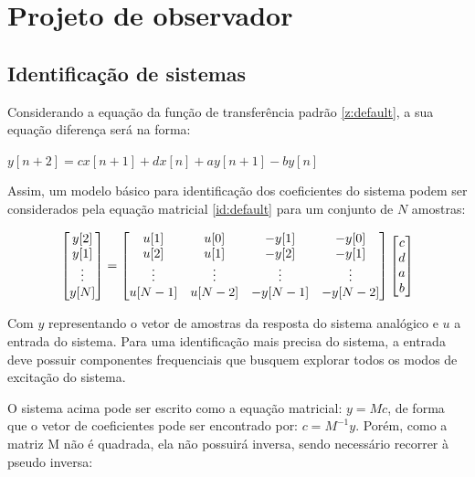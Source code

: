 \section{Projeto de observador}

\subsection{Identificação de sistemas}

Considerando a equação da função de transferência padrão \ref{z:default}, a sua equação diferença será na forma:

\begin{center}
    $y[n+2] = cx[n+1] + dx[n] + ay[n+1] - by[n]$\vspace{4pt}\\
\end{center}

Assim, um modelo básico para identificação dos coeficientes do sistema podem ser considerados pela equação matricial \ref{id:default} para um conjunto de $N$ amostras:

\begin{equation} \label{id:default}
\centering
\begin{bmatrix} y[2] \\ y[1] \\ \vdots \\ y[N] \end{bmatrix} = \begin{bmatrix} u[1] & u[0] & -y[1] & -y[0] \\ u[2] & u[1] & -y[2] & -y[1] \\ \vdots & \vdots & \vdots & \vdots \\ u[N-1] & u[N-2] & -y[N-1] & -y[N-2]\end{bmatrix}\begin{bmatrix} c \\ d \\ a \\ b \end{bmatrix}
\end{equation}

Com $y$ representando o vetor de amostras da resposta do sistema analógico e $u$ a entrada do sistema. Para uma identificação mais precisa do sistema, a entrada deve possuir componentes frequenciais que busquem explorar todos os modos de excitação do sistema.

O sistema acima pode ser escrito como a equação matricial: $y = Mc$, de forma que o vetor de coeficientes pode ser encontrado por: $c = M^{-1}y$. Porém, como a matriz M não é quadrada, ela não possuirá inversa, sendo necessário recorrer à pseudo inversa: 

